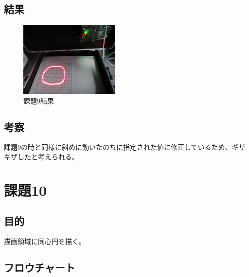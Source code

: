 \documentclass{jarticle}
\begin{document}
\newpage
\subsection{結果}



\begin{figure}[h]
    \centering
    
    \includegraphics[width=5cm]{IMG_1740.JPG}
    \caption{課題9結果}
    \label{fig:my_label}
\end{figure}

\subsection{考察}

課題9の時と同様に斜めに動いたのちに指定された値に修正しているため、ギザギザしたと考えられる。

\section{課題10}


\subsection{目的}
描画領域に同心円を描く。

\subsection{フロウチャート}
\end{document}
